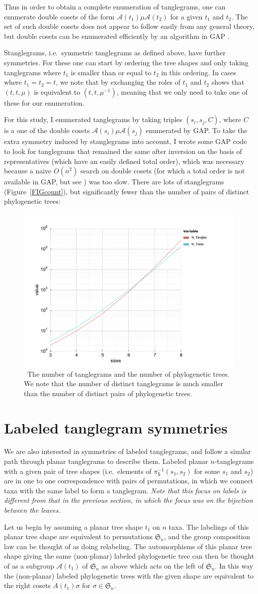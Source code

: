 \documentclass{amsart}
\newcommand{\fS}{\mathfrak S}
\newcommand{\aut}{\mathcal A}
\newcommand{\pairing}{\mu}
\newcommand{\shape}{\mathsf{S}}
\newcommand{\arxiv}[1]{#1}
\newcommand{\FIGcount}{\
\label{FIGcount}
\begin{figure}
  \arxiv{\includegraphics[width=5in]{figures/count}}
\caption{\
  The number of tanglegrams and the number of phylogenetic trees.
  We note that the number of distinct tanglegrams is much smaller than the number of distinct pairs of phylogenetic trees.
}
\end{figure}
}
\begin{document}
Thus in order to obtain a complete enumeration of tanglegrams, one can enumerate double cosets of the form $\aut(t_1) \pairing \aut(t_2)$ for a given $t_1$ and $t_2$.
The set of such double cosets does not appear to follow easily from any general theory, but double cosets can be enumerated efficiently by an algorithm in GAP \cite{GAP4}.

Stanglegrams, i.e.\ symmetric tanglegrams as defined above, have further symmetries.
For these one can start by ordering the tree shapes and only taking tanglegrams where $t_1$ is smaller than or equal to $t_2$ in this ordering.
In cases where $t_1 = t_2 = t$, we note that by exchanging the roles of $t_1$ and $t_2$ shows that $(t, t, \mu)$ is equivalent to $(t, t, \mu^{-1})$, meaning that we only need to take one of these for our enumeration.

For this study, I enumerated tanglegrams by taking triples $(s_i, s_j, C)$, where $C$ is a one of the double cosets $\aut(s_i) \pairing \aut(s_j)$ enumerated by GAP.
To take the extra symmetry induced by stanglegrams into account, I wrote some GAP code to look for tanglegrams that remained the same after inversion on the basis of representatives (which have an easily defined total order), which was necessary because a naive $O(n^2)$ search on double cosets (for which a total order is not available in GAP, but see \cite{Hulpke2003-em}) was too slow.
There are lots of stanglegrams (Figure~\ref{FIGcount}), but significantly fewer than the number of pairs of distinct phylogenetic trees:
\FIGcount



\section{Labeled tanglegram symmetries}
We are also interested in symmetries of labeled tanglegrams, and follow a similar path through planar tanglegrams to describe them.
Labeled planar $n$-tanglegrams with a given pair of tree shapes (i.e.\ elements of $\pi_\shape^{-1}(s_1, s_2)$ for some $s_1$ and $s_2$) are in one to one correspondence with pairs of permutations, in which we connect taxa with the same label to form a tanglegram.
\emph{Note that this focus on labels is different from that in the previous section, in which the focus was on the bijection between the leaves.}

Let us begin by assuming a planar tree shape $t_1$ on $n$ taxa.
The labelings of this planar tree shape are equivalent to permutations $\fS_n$, and the group composition law can be thought of as doing relabeling.
The automorphisms of this planar tree shape giving the same (non-planar) labeled phylogenetic tree can then be thought of as a subgroup $\aut(t_1)$ of $\fS_n$ as above which acts on the left of $\fS_n$.
In this way the (non-planar) labeled phylogenetic trees with the given shape are equivalent to the right cosets $A(t_1) \sigma$ for $\sigma \in \fS_n$.
\end{document}
